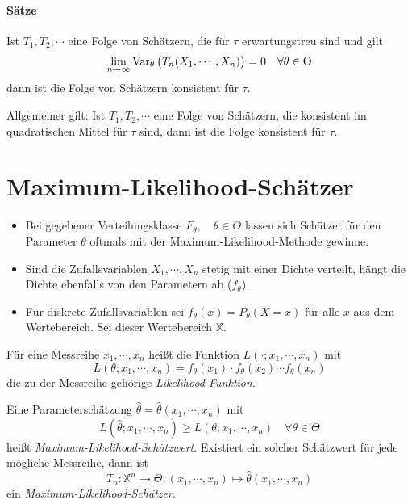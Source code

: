 			\paragraph{Sätze}
				Ist \(T_1, T_2, \cdots\) eine Folge von Schätzern, die für \(\tau\) erwartungstreu sind und gilt
				\begin{equation*}
					\lim\limits_{n \rightarrow \infty} \operatorname{Var}_\theta\big(T_n(X_1, \cdots, X_n)\big) = 0 \quad \forall \theta \in \Theta
				\end{equation*}
				dann ist die Folge von Schätzern konsistent für \(\tau\).

				Allgemeiner gilt: Ist \( T_1, T_2, \cdots \) eine Folge von Schätzern, die konsistent im quadratischen Mittel für \(\tau\) sind, dann ist die Folge konsistent für \(\tau\).

	\section{Maximum-Likelihood-Schätzer}
		\begin{itemize}
			\item Bei gegebener Verteilungsklasse \( F_\theta, \quad \theta \in \Theta \) lassen sich Schätzer für den Parameter \(\theta\) oftmals mit der Maximum-Likelihood-Methode gewinne.
			\item Sind die Zufallsvariablen \( X_1, \cdots, X_n \) stetig mit einer Dichte verteilt, hängt die Dichte ebenfalls von den Parametern ab (\(f_\theta\)).
			\item Für diskrete Zufallsvariablen sei \( f_\theta(x) = P_\theta(X = x) \) für alle \(x\) aus dem Wertebereich. Sei dieser Wertebereich \(\mathbb{X}\).
		\end{itemize}

		Für eine Messreihe \( x_1, \cdots, x_n \) heißt die Funktion \( L(\cdot; x_1, \cdots, x_n) \) mit
		\begin{equation*}
			L(\theta; x_1, \cdots, x_n) = f_\theta(x_1) \cdot f_\theta(x_2) \cdots f_\theta(x_n)
		\end{equation*}
		die zu der Messreihe gehörige \textit{Likelihood-Funktion}.

		Eine Parameterschätzung \( \hat{\theta} = \hat{\theta}(x_1, \cdots, x_n) \) mit
		\begin{equation*}
			L(\hat{\theta}; x_1, \cdots, x_n) \geq L(\theta; x_1, \cdots, x_n) \quad \forall \theta \in \Theta
		\end{equation*}
		heißt \textit{Maximum-Likelihood-Schätzwert}. Existiert ein solcher Schätzwert für jede mögliche Messreihe, dann ist
		\begin{equation*}
			T_n : \mathbb{X}^n \rightarrow \Theta : (x_1, \cdots, x_n) \mapsto \hat{\theta} (x_1, \cdots, x_n)
		\end{equation*}
		ein \textit{Maximum-Likelihood-Schätzer}.

